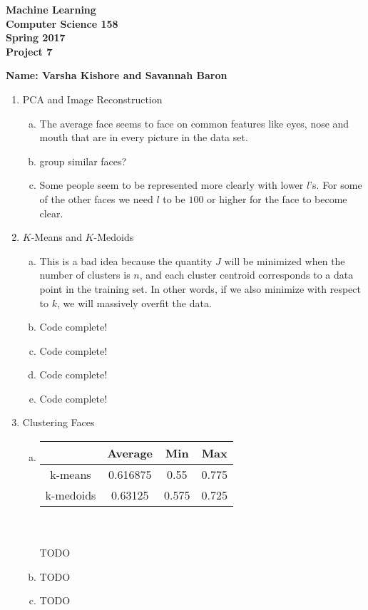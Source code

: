 \documentclass[11pt]{article}
\begin{document}
\newcommand{\Name}[1]{\noindent \textbf{Name:} #1 \\}
\newcommand{\pderiv}[2]{\frac{\partial #1}{\partial #2}}
\newcommand{\psderiv}[3]{\frac{\partial^2 #1}{\partial #2 \partial #3}}

\begin{center}
	\bf
	Machine Learning \\
	Computer Science 158 \\
	Spring 2017 \\
	\rm
	Project 7\\
\end{center}
\noindent \textbf{Name: Varsha Kishore and Savannah Baron} \\

\begin{enumerate}[1]
\item PCA and Image Reconstruction
\begin{enumerate}[(a)]
\item The average face seems to face on common features like eyes, nose and mouth that are in every picture in the data set. 
\item group similar faces?
\item Some people seem to be represented more clearly with lower $l$'s. For some of the other faces we need $l$ to be $100$ or higher for the face to become clear. 
\end{enumerate}
\item $K$-Means and $K$-Medoids
\begin{enumerate}[(a)]
\item This is a bad idea because the quantity $J$ will be minimized when the number of clusters
is $n$, and each cluster centroid corresponds to a data point in the training set. In other words, if we
also minimize with respect to $k$, we will massively overfit the data. 
\item Code complete!
\item Code complete!
\item Code complete!
\item Code complete!
\end{enumerate}
\item Clustering Faces
\begin{enumerate}[(a)]
\item \begin{tabular}{| c | c | c | c |}
  \hline		
   & Average & Min & Max \\
  \hline
  k-means & 0.616875 & 0.55 & 0.775 \\
  k-medoids & 0.63125 & 0.575 & 0.725   \\
  \hline
\end{tabular}\\ \\
TODO
\item TODO
\item TODO
\end{enumerate}
\end{enumerate}
\end{document}
